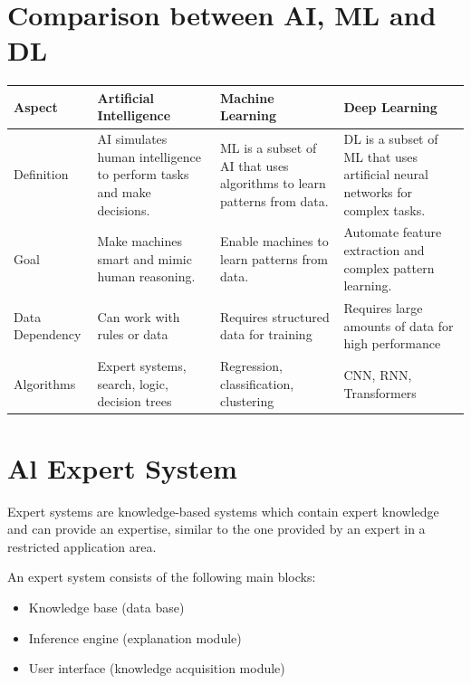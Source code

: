 \section{Comparison between AI, ML and DL}
\begin{tabularx}{\textwidth}{|l|L|L|L|}\hline
   \textbf{Aspect} & \textbf{Artificial Intelligence} &
   \textbf{Machine Learning} & \textbf{Deep Learning} \\\hline
   
   Definition
   & AI simulates human intelligence to perform tasks and make decisions.
   & ML is a subset of AI that uses algorithms to learn patterns from data.
   & DL is a subset of ML that uses artificial neural networks for complex tasks.
   \\\hline
   
   Goal 
   & Make machines smart and mimic human reasoning.
   & Enable machines to learn patterns from data.
   & Automate feature extraction and complex pattern learning.
   \\\hline
   
   Data Dependency
   & Can work with rules or data
   & Requires structured data for training
   & Requires large amounts of data for high performance
   \\\hline
   
   Algorithms
   & Expert systems, search, logic, decision trees
   & Regression, classification, clustering
   & CNN, RNN, Transformers
   \\\hline
\end{tabularx}



\section{Al Expert System}
Expert systems are knowledge-based systems which contain expert knowledge and can provide an expertise, similar to the one provided by an expert in a restricted application area.

An expert system consists of the following main blocks:
\begin{itemize}[parsep=0.5em, topsep=-0.5em]
   \item Knowledge base (data base)
   \item Inference engine (explanation module)
   \item User interface (knowledge acquisition module)
\end{itemize}



